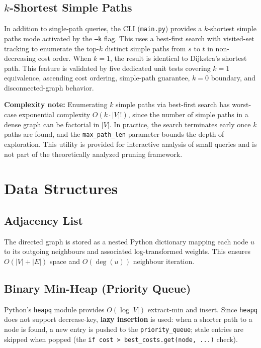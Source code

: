 \subsection{\texorpdfstring{$k$}{k}-Shortest Simple Paths}

In addition to single-path queries, the CLI (\texttt{main.py}) provides a $k$-shortest simple paths mode activated by the \texttt{--k} flag. This uses a best-first search with visited-set tracking to enumerate the top-$k$ distinct simple paths from $s$ to $t$ in non-decreasing cost order. When $k=1$, the result is identical to Dijkstra's shortest path. This feature is validated by five dedicated unit tests covering $k=1$ equivalence, ascending cost ordering, simple-path guarantee, $k=0$ boundary, and disconnected-graph behavior.

\textbf{Complexity note:} Enumerating $k$ simple paths via best-first search has worst-case exponential complexity $O(k \cdot |V|!)$, since the number of simple paths in a dense graph can be factorial in $|V|$. In practice, the search terminates early once $k$ paths are found, and the \texttt{max\_path\_len} parameter bounds the depth of exploration. This utility is provided for interactive analysis of small queries and is not part of the theoretically analyzed pruning framework.

\section{Data Structures}

\subsection{Adjacency List}

The directed graph is stored as a nested Python dictionary mapping each node $u$ to its outgoing neighbours and associated log-transformed weights. This ensures $O(|V|+|E|)$ space and $O(\deg(u))$ neighbour iteration.

\subsection{Binary Min-Heap (Priority Queue)}

Python's \texttt{heapq} module provides $O(\log|V|)$ extract-min and insert. Since \texttt{heapq} does not support decrease-key, \textbf{lazy insertion} is used: when a shorter path to a node is found, a new entry is pushed to the \texttt{priority\_queue}; stale entries are skipped when popped (the \texttt{if cost > best\_costs.get(node, ...)} check).


